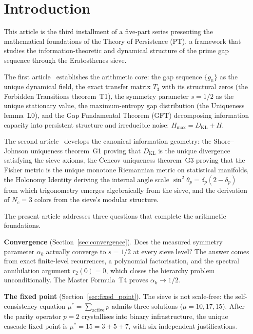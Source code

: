 \documentclass[12pt,a4paper]{article}
\begin{document}
\section{Introduction}
\label{sec:introduction}

This article is the third installment of a five-part series presenting
the mathematical foundations of the Theory of Persistence (PT), a
framework that studies the information-theoretic and dynamical structure
of the prime gap sequence through the Eratosthenes sieve.

The first article~\cite{companion_M1} establishes the arithmetic core:
the gap sequence $\{g_n\}$ as the unique dynamical field, the exact
transfer matrix $T_3$ with its structural zeros (the Forbidden
Transitions theorem~T1), the symmetry parameter $s = 1/2$ as the unique
stationary value, the maximum-entropy gap distribution (the Uniqueness
lemma~L0), and the Gap Fundamental Theorem (GFT) decomposing information
capacity into persistent structure and irreducible noise:
$H_{\max} = D_{\mathrm{KL}} + H$.

The second article~\cite{companion_M2} develops the canonical
information geometry: the Shore--Johnson uniqueness theorem~G1 proving
that $D_{\mathrm{KL}}$ is the unique divergence satisfying the sieve
axioms, the \v{C}encov uniqueness theorem~G3 proving that the Fisher
metric is the unique monotone Riemannian metric on statistical manifolds,
the Holonomy Identity deriving the internal angle scale
$\sin^2\!\theta_p = \delta_p(2 - \delta_p)$ from which trigonometry
emerges algebraically from the sieve, and the derivation of $N_c = 3$
colors from the sieve's modular structure.

The present article addresses three questions that complete the
arithmetic foundations.

\textbf{Convergence} (Section~\ref{sec:convergence}).  Does the measured
symmetry parameter $\alpha_k$ actually converge to $s = 1/2$ at every
sieve level?  The answer comes from exact finite-level recurrences, a
polynomial factorisation, and the spectral annihilation argument
$r_2(0) = 0$, which closes the hierarchy problem unconditionally.
The Master Formula~T4 proves $\alpha_k \to 1/2$.

\textbf{The fixed point} (Section~\ref{sec:fixed_point}).  The sieve
is not scale-free: the self-consistency equation
$\mu^* = \sum_{\text{active}} p$ admits three solutions
($\mu = 10, 17, 15$).  After the parity operator $p = 2$ crystallises
into binary infrastructure, the unique cascade fixed point is
$\mu^* = 15 = 3 + 5 + 7$, with six independent justifications.
\end{document}
